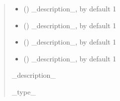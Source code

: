 \documentclass[letterpaper,10pt,english]{sphinxmanual}
\begin{document}
\begin{fulllineitems}
\begin{fulllineitems}
\begin{quote}
\begin{description}
\begin{itemize}
\item {} 
\sphinxAtStartPar
{} (\sphinxstyleliteralemphasis{\sphinxupquote{, }}) \textendash{} \_description\_, by default 1

\item {} 
\sphinxAtStartPar
{} (\sphinxstyleliteralemphasis{\sphinxupquote{, }}) \textendash{} \_description\_, by default 1

\item {} 
\sphinxAtStartPar
{} (\sphinxstyleliteralemphasis{\sphinxupquote{, }}) \textendash{} \_description\_, by default 1

\item {} 
\sphinxAtStartPar
{} (\sphinxstyleliteralemphasis{\sphinxupquote{, }}) \textendash{} \_description\_, by default 1

\end{itemize}

\sphinxAtStartPar
\_description\_

\sphinxAtStartPar
\_type\_

\end{description}\end{quote}

\end{fulllineitems}


\begin{fulllineitems}
\label{\detokenize{src.models.residential.scripts.residential:src.models.residential.scripts.residential.residentialModule.hr_map}}
\pysigstartsignatures
\pysigline
{}
\pysigstopsignatures
\end{fulllineitems}


\end{fulllineitems}
\end{document}
